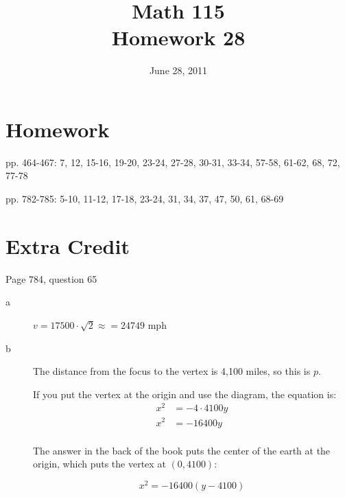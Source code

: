 \documentclass[fleqn,addpoints]{exam}
\title{Math 115 \\ Homework 28}
\date{June 28, 2011}
\begin{document}
\maketitle



\section{Homework}
\begin{itemize*}
  \item pp. 464-467: 7, 12, 15-16, 19-20, 23-24, 27-28, 30-31, 33-34, 57-58, 61-62, 68, 72,  77-78
  \item pp. 782-785: 5-10, 11-12, 17-18, 23-24, 31, 34, 37, 47, 50, 61, 68-69
\end{itemize*}

\section{Extra Credit}
Page 784, question 65

\ifprintanswers

\begin{description}
\item[a] $v = 17500 \cdot \sqrt{2} \approx = 24749 \text{ mph}$

\item[b]
The distance from the focus to the vertex is 4,100 miles, so this is $p$.

If you put the vertex at the origin and use the diagram, the equation is:
\begin{align*}
  x^2 &= -4 \cdot 4100 y \\
  x^2 &= -16400 y \\
\end{align*}

The answer in the back of the book puts the center of the earth at the origin, which puts the vertex at $(0, 4100)$:

\[
  x^2 = -16400(y - 4100)
\]

\end{description}
\end{document}
